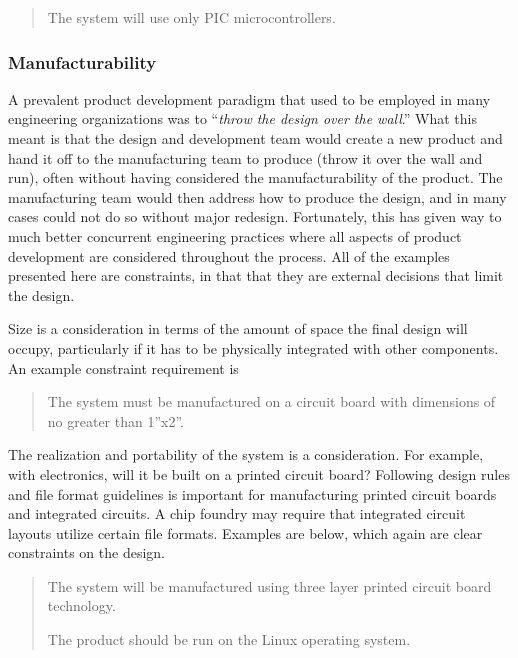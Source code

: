 \begin{quote}
The system will use only PIC microcontrollers.
\end{quote}

\subsubsection*{Manufacturability}\label{manufacturability}

A prevalent product development paradigm that used to be employed in
many engineering organizations was to ``\emph{throw the design over the
wall}.'' What this meant is that the design and development team would
create a new product and hand it off to the manufacturing team to
produce (throw it over the wall and run), often without having
considered the manufacturability of the product. The manufacturing team
would then address how to produce the design, and in many cases could
not do so without major redesign. Fortunately, this has given way to
much better concurrent engineering practices where all aspects of
product development are considered throughout the process. All of the
examples presented here are constraints, in that that they are external
decisions that limit the design.

Size is a consideration in terms of the amount of space the final design
will occupy, particularly if it has to be physically integrated with
other components. An example constraint requirement is

\begin{quote}
The system must be manufactured on a circuit board with dimensions of no
greater than 1''x2''.
\end{quote}

The realization and portability of the system is a consideration. For
example, with electronics, will it be built on a printed circuit board?
Following design rules and file format guidelines is important for
manufacturing printed circuit boards and integrated circuits. A chip
foundry may require that integrated circuit layouts utilize certain file
formats. Examples are below, which again are clear constraints on the
design.

\begin{quote}
The system will be manufactured using three layer printed circuit board
technology.

The product should be run on the Linux operating system.
\end{quote}

